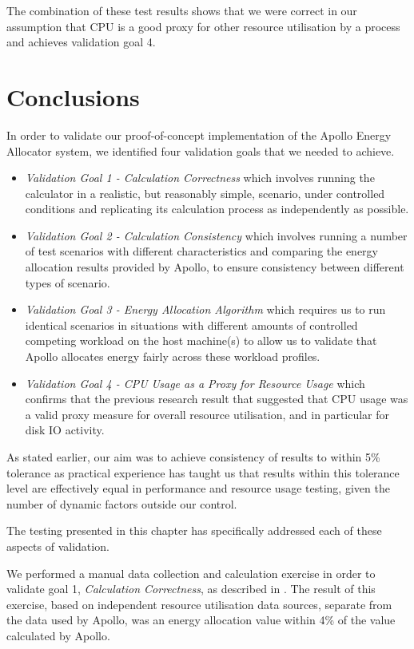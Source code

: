 The combination of these test results shows that we were correct in our assumption that CPU is a good proxy for other resource utilisation by a process and achieves validation goal 4.

\section{Conclusions}
\label{sec:energy-conclusions}

In order to validate our proof-of-concept implementation of the Apollo Energy Allocator system, we identified four validation goals that we needed to achieve.

\begin{itemize}
	\item \textit{Validation Goal 1 - Calculation Correctness} which involves running the calculator in a realistic, but reasonably simple, scenario, under controlled conditions and replicating its calculation process as independently as possible.
	\item \textit{Validation Goal 2 - Calculation Consistency} which involves running a number of test scenarios with different characteristics and comparing the energy allocation results provided by Apollo, to ensure consistency between different types of scenario.
	\item \textit{Validation Goal 3 - Energy Allocation Algorithm} which requires us to run identical scenarios in situations with different amounts of controlled competing workload on the host machine(s) to allow us to validate that Apollo allocates energy fairly across these workload profiles.
	\item \textit{Validation Goal 4 - CPU Usage as a Proxy for Resource Usage} which confirms that the previous research result that suggested that CPU usage was a valid proxy measure for overall resource utilisation, and in particular for disk IO activity.
\end{itemize}

As stated earlier, our aim was to achieve consistency of results to within 5\% tolerance as practical experience has taught us that results within this tolerance level are effectively equal in performance and resource usage testing, given the number of dynamic factors outside our control.

The testing presented in this chapter has specifically addressed each of these aspects of validation.

We performed a manual data collection and calculation exercise in order to validate goal 1, \textit{Calculation Correctness}, as described in .  The result of this exercise, based on independent resource utilisation data sources, separate from the data used by Apollo, was an energy allocation value within 4\%  of the value calculated by Apollo.

